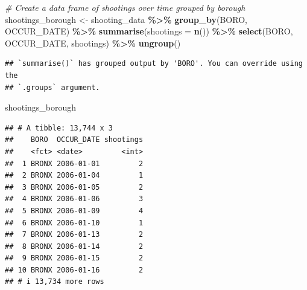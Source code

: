 \documentclass[
]{article}
\newenvironment{Shaded}{\begin{snugshade}}{\end{snugshade}}
\newcommand{\AttributeTok}[1]{\textcolor[rgb]{0.13,0.29,0.53}{#1}}
\newcommand{\CommentTok}[1]{\textcolor[rgb]{0.56,0.35,0.01}{\textit{#1}}}
\newcommand{\FunctionTok}[1]{\textcolor[rgb]{0.13,0.29,0.53}{\textbf{#1}}}
\newcommand{\NormalTok}[1]{#1}
\newcommand{\OtherTok}[1]{\textcolor[rgb]{0.56,0.35,0.01}{#1}}
\newcommand{\SpecialCharTok}[1]{\textcolor[rgb]{0.81,0.36,0.00}{\textbf{#1}}}
\begin{document}
\begin{Shaded}
\begin{Highlighting}[]
\CommentTok{\# Create a data frame of shootings over time grouped by borough}
\NormalTok{shootings\_borough }\OtherTok{\textless{}{-}}\NormalTok{ shooting\_data }\SpecialCharTok{\%\textgreater{}\%}
  \FunctionTok{group\_by}\NormalTok{(BORO, OCCUR\_DATE) }\SpecialCharTok{\%\textgreater{}\%}
  \FunctionTok{summarise}\NormalTok{(}\AttributeTok{shootings =} \FunctionTok{n}\NormalTok{()) }\SpecialCharTok{\%\textgreater{}\%}
  \FunctionTok{select}\NormalTok{(BORO, OCCUR\_DATE, shootings) }\SpecialCharTok{\%\textgreater{}\%}
  \FunctionTok{ungroup}\NormalTok{()}
\end{Highlighting}
\end{Shaded}

\begin{verbatim}
## `summarise()` has grouped output by 'BORO'. You can override using the
## `.groups` argument.
\end{verbatim}

\begin{Shaded}
\begin{Highlighting}[]
\NormalTok{shootings\_borough}
\end{Highlighting}
\end{Shaded}

\begin{verbatim}
## # A tibble: 13,744 x 3
##    BORO  OCCUR_DATE shootings
##    <fct> <date>         <int>
##  1 BRONX 2006-01-01         2
##  2 BRONX 2006-01-04         1
##  3 BRONX 2006-01-05         2
##  4 BRONX 2006-01-06         3
##  5 BRONX 2006-01-09         4
##  6 BRONX 2006-01-10         1
##  7 BRONX 2006-01-13         2
##  8 BRONX 2006-01-14         2
##  9 BRONX 2006-01-15         2
## 10 BRONX 2006-01-16         2
## # i 13,734 more rows
\end{verbatim}
\end{document}
